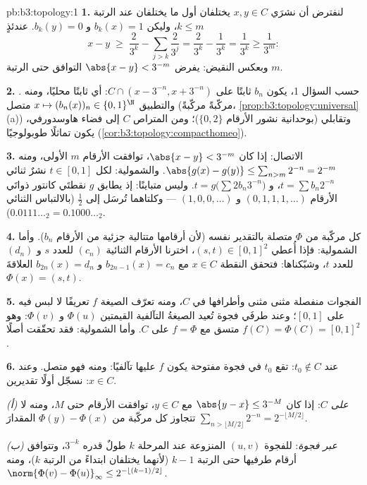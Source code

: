 \begin{solution}{pb:b3:topology:1}
\textbf{1.} لنفترض أن نشرَي $x, y \in C$ يختلفان أول ما يختلفان
عند الرتبة $k \leq m$، وليكن $b_k(x) = 1$ و $b_k(y) = 0$.
عندئذٍ
\[
x - y \;\geq\; \frac{2}{3^k} - \sum_{j > k}\frac{2}{3^j}
= \frac{2}{3^k} - \frac{1}{3^k} = \frac1{3^k} \geq \frac1{3^m}:
\]
وبعكس النقيض: يفرض $\abs{x - y} < 3^{-m}$ التوافق حتى الرتبة $m$.

\textbf{2.} حسب السؤال 1، يكون $b_n$ ثابتًا على $C \cap (x -
3^{-n}, x + 3^{-n})$: أي
ثابتًا محليًا، ومنه . والتطبيق $x \mapsto (b_n(x))_n \in \{0,1\}^\N$ متصل (مركّبةً
مركّبةً، \cref{prop:b3:topology:universal}(a)) وتقابلي (بوحدانية نشور الأرقام
$\{0,2\}$)؛ ومن المتراص $C$ إلى فضاء هاوسدورفي، يكون تماثلًا
طوبولوجيًا (\cref{cor:b3:topology:compacthomeo}).

\textbf{3.} الاتصال: إذا كان $\abs{x - y} < 3^{-m}$، توافقت الأرقام $m$
الأولى، ومنه $\abs{g(x) - g(y)} \leq \sum_{n > m}2^{-n}
= 2^{-m}$. والشمولية: لكل $t \in [0,1]$ نشرٌ ثنائي
$t = \sum b_n2^{-n}$، و $t = g\bigl(\sum
2b_n3^{-n}\bigr)$. وليس متباينًا: إذ يطابق $g$ نقطتَي كانتور
ذواتَي الأرقام $(0,1,1,1,\dots)$ و $(1,0,0,\dots)$ --- وكلتاهما تُرسَل
إلى $\frac12$ (بالالتباس الثنائي $0.0111\ldots_2 =
0.1000\ldots_2$).

\textbf{4.} كل مركّبة من $\Phi$ متصلة بالتقدير نفسه (لأن
أرقامها متتالية جزئية من الأرقام $b_n$). وأما الشمولية: فإذا
أُعطي $(s, t) \in [0,1]^2$، اخترنا الأرقام الثنائية $(c_n)$ للعدد $s$
و $(d_n)$ للعدد $t$، وشبّكناها: فتحقق النقطة $x
\in C$ مع $b_{2n-1}(x) = c_n$
و $b_{2n}(x) = d_n$ العلاقةَ $\Phi(x) = (s,t)$.

\textbf{5.} الفجوات منفصلة مثنى مثنى وأطرافها في $C$، ومنه
تعرّف الصيغة $f$ تعريفًا لا لبس فيه على $[0,1]$؛ وعند طرفَي
فجوة تُعيد الصيغةُ التآلفية القيمتين $\Phi(u)$ و $\Phi(v)$:
وهو متسق مع $f = \Phi$ على $C$. وأما الشمولية: فقد تحقّقت أصلًا
$f(C) = \Phi(C) = [0,1]^2$.

\textbf{6.} عند $t_0 \notin C$: تقع $t_0$ في فجوة مفتوحة يكون
$f$ عليها تآلفيًا: ومنه فهو متصل. وعند $x \in C$: نسجّل أولًا
تقديرين.

\emph{(أ) على $C$}: إذا كان $\abs{y - x} \leq 3^{-M}$ مع $y \in C$، توافقت
الأرقام حتى $M$، ومنه لا تتجاوز كل مركّبة من $\Phi(y)
- \Phi(x)$ المقدارَ
$\sum_{n > \lfloor M/2\rfloor} 2^{-n} =
2^{-\lfloor M/2\rfloor}$.

\emph{(ب) عبر فجوة}: للفجوة $(u,v)$ المنزوعة عند المرحلة $k$
طولٌ قدره $3^{-k}$، وتتوافق أرقام طرفيها حتى الرتبة $k - 1$
(لأنهما يختلفان ابتداءً من الرتبة $k$)، ومنه $\norm{\Phi(v) - \Phi(u)}_\infty \leq
2^{-\lfloor (k-1)/2\rfloor}$.


\end{solution}
